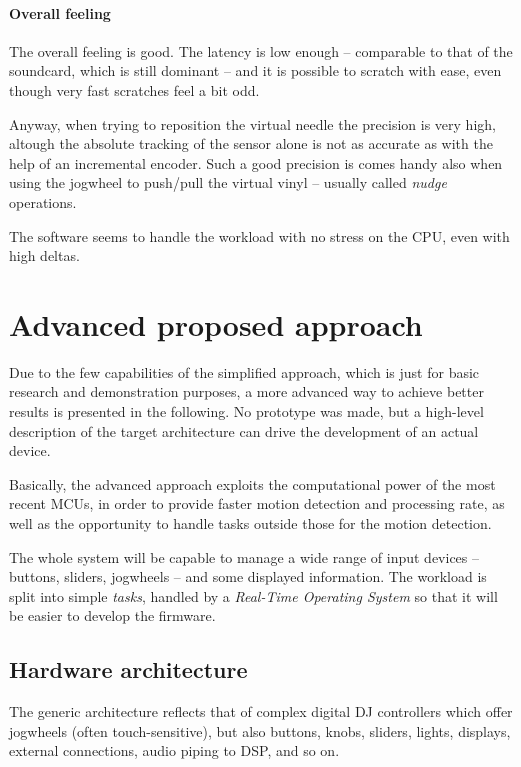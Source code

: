 \documentclass[a4paper,10pt]{article}
\begin{document}
\begin{multicols}{2}
\paragraph{Overall feeling}
The overall feeling is good. The latency is low enough -- comparable to that
of the soundcard, which is still dominant -- and it is possible to scratch
with ease, even though very fast scratches feel a bit odd.

Anyway, when trying to reposition the virtual needle the precision is very
high, altough the absolute tracking of the sensor alone is not as accurate as
with the help of an incremental encoder. Such a good precision is comes handy
also when using the jogwheel to push/pull the virtual vinyl -- usually called
\emph{nudge} operations.

The software seems to handle the workload with no stress on the CPU, even with
high deltas.


\section{Advanced proposed approach}
\label{sec:advanced_approach}

Due to the few capabilities of the simplified approach, which is just for
basic research and demonstration purposes, a more advanced way to achieve
better results is presented in the following. No prototype was made, but a
high-level description of the target architecture can drive the development
of an actual device.

Basically, the advanced approach exploits the computational power of the most
recent MCUs, in order to provide faster motion detection and processing rate,
as well as the opportunity to handle tasks outside those for the motion
detection.

The whole system will be capable to manage a wide range of input devices --
buttons, sliders, jogwheels -- and some displayed information. The workload is
split into simple \emph{tasks}, handled by a \emph{Real-Time Operating System}
so that it will be easier to develop the firmware.


\subsection{Hardware architecture}

The generic architecture reflects that of complex digital DJ controllers
which offer jogwheels (often touch-sensitive), but also buttons, knobs,
sliders, lights, displays, external connections, audio piping to DSP, and so
on.


\end{multicols}
\end{document}
